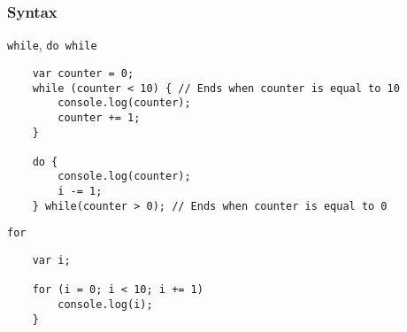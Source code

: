 \begin{frame}[fragile]
  \frametitle{Syntax}

  \begin{block}{\texttt{while}, \texttt{do while}}
    \scriptsize{
    \begin{verbatim}
    var counter = 0;
    while (counter < 10) { // Ends when counter is equal to 10
        console.log(counter);
        counter += 1;
    }

    do {
        console.log(counter);
        i -= 1;
    } while(counter > 0); // Ends when counter is equal to 0
    \end{verbatim}
    }
  \end{block}

  \pause

  \begin{block}{\texttt{for}}
    {\scriptsize
    \begin{verbatim}
    var i;

    for (i = 0; i < 10; i += 1)
        console.log(i);
    }
    \end{verbatim}
    }
  \end{block}
\end{frame}
